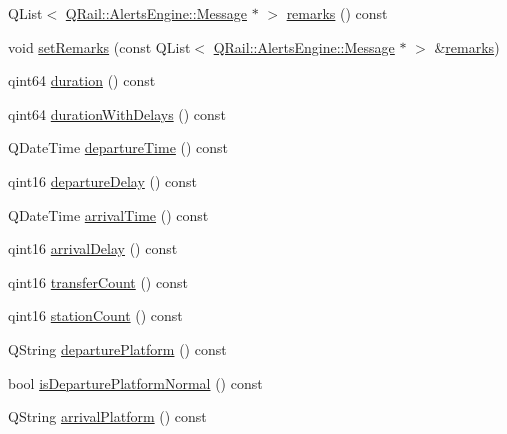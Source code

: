 \begin{DoxyCompactItemize}
\item 
Q\+List$<$ \mbox{\hyperlink{classQRail_1_1AlertsEngine_1_1Message}{Q\+Rail\+::\+Alerts\+Engine\+::\+Message}} $\ast$ $>$ \mbox{\hyperlink{classQRail_1_1RouterEngine_1_1Route_acf7c65a4556fa8bdccff820dd8f8acfd}{remarks}} () const
\item 
void \mbox{\hyperlink{classQRail_1_1RouterEngine_1_1Route_a4882ad008ab1eff92496fa76c2e15ee1}{set\+Remarks}} (const Q\+List$<$ \mbox{\hyperlink{classQRail_1_1AlertsEngine_1_1Message}{Q\+Rail\+::\+Alerts\+Engine\+::\+Message}} $\ast$ $>$ \&\mbox{\hyperlink{classQRail_1_1RouterEngine_1_1Route_acf7c65a4556fa8bdccff820dd8f8acfd}{remarks}})
\item 
qint64 \mbox{\hyperlink{classQRail_1_1RouterEngine_1_1Route_a799b15f57d18e4a06d9bf9df10bd5478}{duration}} () const
\item 
qint64 \mbox{\hyperlink{classQRail_1_1RouterEngine_1_1Route_aa94695b4a781d26eb8c8a4d314ac0ed6}{duration\+With\+Delays}} () const
\item 
Q\+Date\+Time \mbox{\hyperlink{classQRail_1_1RouterEngine_1_1Route_add11a442094049aa98e9c6e3bd0f87ee}{departure\+Time}} () const
\item 
qint16 \mbox{\hyperlink{classQRail_1_1RouterEngine_1_1Route_a7578f0463317c58665d96976d88a8066}{departure\+Delay}} () const
\item 
Q\+Date\+Time \mbox{\hyperlink{classQRail_1_1RouterEngine_1_1Route_a848b871103beedbc3d1105e95bc8a74e}{arrival\+Time}} () const
\item 
qint16 \mbox{\hyperlink{classQRail_1_1RouterEngine_1_1Route_a98ab7ca5c9bb67348f64eae41750f86f}{arrival\+Delay}} () const
\item 
qint16 \mbox{\hyperlink{classQRail_1_1RouterEngine_1_1Route_a050c21366504769b75112f28795c3dea}{transfer\+Count}} () const
\item 
qint16 \mbox{\hyperlink{classQRail_1_1RouterEngine_1_1Route_af2e7e13f00ef8079750a7012af2674e4}{station\+Count}} () const
\item 
Q\+String \mbox{\hyperlink{classQRail_1_1RouterEngine_1_1Route_ae442bf6397b5371cbf312b02b475d400}{departure\+Platform}} () const
\item 
bool \mbox{\hyperlink{classQRail_1_1RouterEngine_1_1Route_ad7f0d8df720b0ce9cf93037537db2067}{is\+Departure\+Platform\+Normal}} () const
\item 
Q\+String \mbox{\hyperlink{classQRail_1_1RouterEngine_1_1Route_a0d6710f4d8de4c5cb6cb0497c07e0a13}{arrival\+Platform}} () const
\item 

\end{DoxyCompactItemize}
